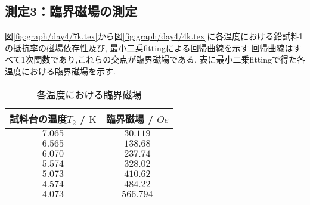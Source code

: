 \subsection{測定3：臨界磁場の測定}
図\ref{fig:graph/day4/7k.tex}から図\ref{fig:graph/day4/4k.tex}に各温度における鉛試料1の抵抗率の磁場依存性及び,
最小二乗fittingによる回帰曲線を示す.回帰曲線はすべて1次関数であり,これらの交点が臨界磁場である.
表に最小二乗fittingで得た各温度における臨界磁場を示す.
\begin{table}[h]
\caption{各温度における臨界磁場}
\label{tab:rinkaijiba}
\centering
\begin{tabular}{cc}
\hline
試料台の温度$T_2$ / $\si{\kelvin}$&臨界磁場 / $\si{Oe}$\\
\hline \hline
$7.065$&$30.119$\\
$6.565$&$138.68$\\
$6.070$&$237.74$\\
$5.574$&$328.02$\\
$5.073$&$410.62$\\
$4.574$&$484.22$\\
$4.073$&$566.794$\\
\hline
\end{tabular}
\end{table}
